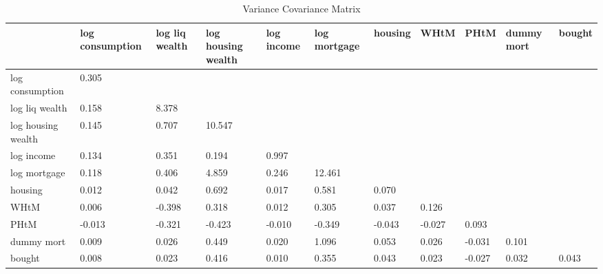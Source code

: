 \begin{table}[htbp]
\caption{\label{clabel} Variance Covariance Matrix}\centering\medskip
\begin{tabular}{lllllllllll} \hline \hline
 & log consumption  & log liq wealth  & log housing wealth  & log income  & log mortgage  & housing  & WHtM  & PHtM  & dummy mort  & bought  \\  \hline 
log consumption &     0.305 \\  
log liq wealth &     0.158 &     8.378 \\  
log housing wealth &     0.145 &     0.707 &    10.547 \\  
log income &     0.134 &     0.351 &     0.194 &     0.997 \\  
log mortgage &     0.118 &     0.406 &     4.859 &     0.246 &    12.461 \\  
housing &     0.012 &     0.042 &     0.692 &     0.017 &     0.581 &     0.070 \\  
WHtM &     0.006 &    -0.398 &     0.318 &     0.012 &     0.305 &     0.037 &     0.126 \\  
PHtM &    -0.013 &    -0.321 &    -0.423 &    -0.010 &    -0.349 &    -0.043 &    -0.027 &     0.093 \\  
dummy mort &     0.009 &     0.026 &     0.449 &     0.020 &     1.096 &     0.053 &     0.026 &    -0.031 &     0.101 \\  
bought &     0.008 &     0.023 &     0.416 &     0.010 &     0.355 &     0.043 &     0.023 &    -0.027 &     0.032 &     0.043 \\  
\hline \hline \end{tabular}
\end{table}

